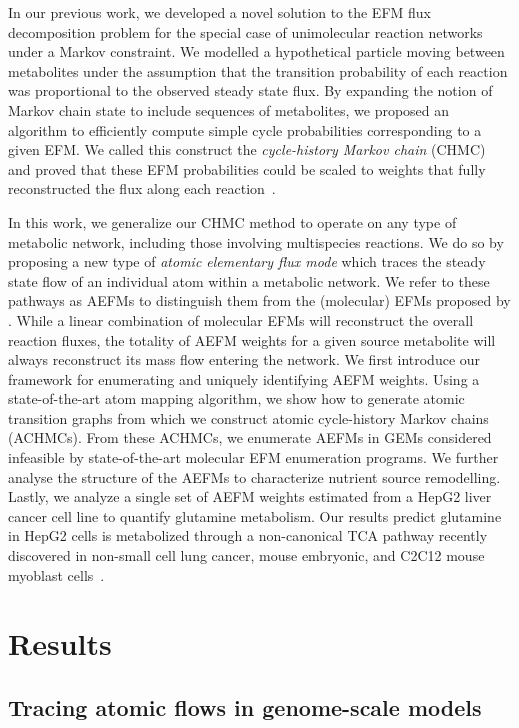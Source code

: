 \documentclass[12pt]{article}
\begin{document}
In our previous work, we developed a novel solution to the EFM flux
decomposition problem for the special case of unimolecular reaction
networks under a Markov constraint. We modelled a hypothetical particle
moving between metabolites under the assumption that the transition
probability of each reaction was proportional to the observed steady state
flux. By expanding the notion of Markov chain state to include sequences
of metabolites, we proposed an algorithm to efficiently compute simple
cycle probabilities corresponding to a given EFM. We called this construct
the \emph{cycle-history Markov chain} (CHMC) and proved that these EFM
probabilities could be scaled to weights that fully reconstructed the flux
along each reaction~\citep{ChitpinJustinG2023AMct}.

In this work, we generalize our CHMC method to operate on any type of
metabolic network, including those involving multispecies reactions. We do
so by proposing a new type of \emph{atomic elementary flux mode} which
traces the steady state flow of an individual atom within a metabolic
network. We refer to these pathways as AEFMs to distinguish them from the
(molecular) EFMs proposed by \citeauthor{SchusterStefan1994Oefm}. While
a linear combination of molecular EFMs will reconstruct the overall
reaction fluxes, the totality of AEFM weights for a given source
metabolite will always reconstruct its mass flow entering the network. We
first introduce our framework for enumerating and uniquely identifying
AEFM weights. Using a state-of-the-art atom mapping algorithm, we show how
to generate atomic transition graphs from which we construct atomic
cycle-history Markov chains (ACHMCs). From these ACHMCs, we enumerate
AEFMs in GEMs considered infeasible by state-of-the-art molecular EFM
enumeration programs. We further analyse the structure of the AEFMs to
characterize nutrient source remodelling. Lastly, we analyze a single set
of AEFM weights estimated from a HepG2 liver cancer cell line to quantify
glutamine metabolism. Our results predict glutamine in HepG2 cells is
metabolized through a non-canonical TCA pathway recently discovered in
non-small cell lung cancer, mouse embryonic, and C2C12 mouse myoblast
cells~\citep{ArnoldPaigeK2022Anta}.

\section*{Results}

\subsection*{Tracing atomic flows in genome-scale models} %
\end{document}
